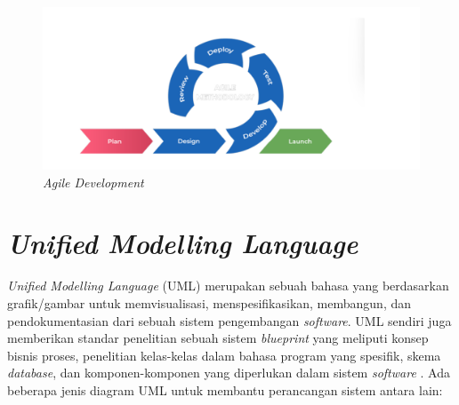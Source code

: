 \begin{figure}[h]
	\centering
	\includegraphics[width=1\linewidth]{konten//gambar/agile.png}
	\caption{\textit{Agile Development}}
	\label{fig:enter-label}
\end{figure}

\section{\textit{Unified Modelling Language}}

\textit{Unified Modelling Language} (UML) merupakan sebuah bahasa yang berdasarkan grafik/gambar untuk memvisualisasi, menspesifikasikan, membangun, dan pendokumentasian dari sebuah sistem pengembangan \textit{software}. UML sendiri juga memberikan standar penelitian sebuah sistem \textit{blueprint} yang meliputi konsep bisnis proses, penelitian kelas-kelas dalam bahasa program yang spesifik, skema \textit{database}, dan komponen-komponen yang diperlukan dalam sistem \textit{software} \cite{Mubarak2019}. Ada beberapa jenis diagram UML untuk membantu perancangan sistem antara lain:

